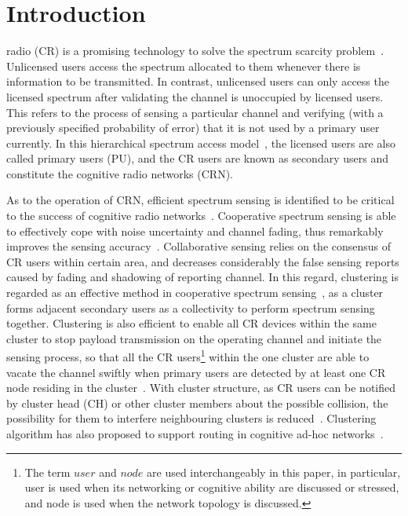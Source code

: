 \documentclass[10pt,journal,compsoc]{IEEEtran}
\theoremstyle{mytheoremstyle}
\theoremstyle{mytheoremstyle}
\theoremstyle{mytheoremstyle}
\begin{document}
\graphicspath{
{../figures/04_clutering/}
}


\section{Introduction}
\label{intro}
 radio (CR) is a promising technology to solve the spectrum scarcity problem~\cite{Mitola}.
Unlicensed users access the spectrum allocated to them whenever there is information to be transmitted.
In contrast, unlicensed users can only access the licensed spectrum after validating the channel is unoccupied by licensed users.
This refers to the process of sensing a particular channel and verifying (with a previously specified probability of error) that it is not used by a primary user currently.
In this hierarchical spectrum access model~\cite{zhao_survey_DSA_2007}, the licensed users are also called primary users (PU), and the CR users are known as secondary users and constitute the cognitive radio networks (CRN).

As to the operation of CRN, efficient spectrum sensing is identified to be critical to the success of cognitive radio networks~\cite{Sahai_FundamentalDesignTradeoffs2006}.
Cooperative spectrum sensing is able to effectively cope with noise uncertainty and channel fading, thus remarkably improves the sensing accuracy~\cite{coorperativeSensing_Akyildiz11}.
Collaborative sensing relies on the consensus of CR users within certain area, and decreases considerably the false sensing reports caused by fading and shadowing of reporting channel.
In this regard, clustering is regarded as an effective method in cooperative spectrum sensing~\cite{Sun07_clustering_spectrum_secsing, Zhao07}, as a cluster forms adjacent secondary users as a collectivity to perform spectrum sensing together.
Clustering is also efficient to enable all CR devices within the same cluster to stop payload transmission on the operating channel and initiate the sensing process, so that all the CR users\footnote{The term $\textit{user}$ and $\textit{node}$ are used interchangeably in this paper, in particular, user is used when its networking or cognitive ability are discussed or stressed, and node is used when the network topology is discussed.} within the one cluster are able to vacate the channel swiftly when primary users are detected by at least one CR node residing in the cluster~\cite{willkomm08}.
With cluster structure, as CR users can be notified by cluster head (CH) or other cluster members about the possible collision, the possibility for them to interfere neighbouring clusters is reduced~\cite{centralizedSharing80222}. 
Clustering algorithm has also proposed to support routing in cognitive ad-hoc networks~\cite{Abbasi_survey_07}.
\end{document}

